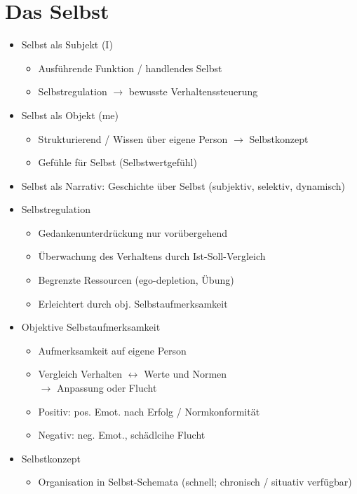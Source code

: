 \documentclass[11pt, paper=a4, twocolumn]{scrartcl}
\begin{document}
	\section{Das Selbst}
		\begin{itemize}
			\item Selbst als Subjekt (I)
				\begin{itemize}
					\item Ausführende Funktion / handlendes Selbst
					\item Selbstregulation $\rightarrow$ bewusste Verhaltenssteuerung
				\end{itemize}
			\item Selbst als Objekt (me)
				\begin{itemize}
					\item Strukturierend / Wissen über eigene Person $\rightarrow$ Selbstkonzept
					\item Gefühle für Selbst (Selbstwertgefühl)
				\end{itemize}
			\item Selbst als Narrativ: Geschichte über Selbst (subjektiv, selektiv, dynamisch)
			\item Selbstregulation
				\begin{itemize}
					\item Gedankenunterdrückung nur vorübergehend
					\item Überwachung des Verhaltens durch Ist-Soll-Vergleich
					\item Begrenzte Ressourcen (ego-depletion, Übung)
					\item Erleichtert durch obj. Selbstaufmerksamkeit
				\end{itemize}
			\item Objektive Selbstaufmerksamkeit
				\begin{itemize}
					\item Aufmerksamkeit auf eigene Person
					\item Vergleich Verhalten $\leftrightarrow$ Werte und Normen\\
						$\rightarrow$ Anpassung oder Flucht
					\item Positiv: pos. Emot. nach Erfolg / Normkonformität
					\item Negativ: neg. Emot., schädlcihe Flucht
				\end{itemize}
			\item Selbstkonzept
				\begin{itemize}
					\item Organisation in Selbst-Schemata (schnell; chronisch / situativ verfügbar)

\end{itemize}
\end{itemize}
\end{document}
